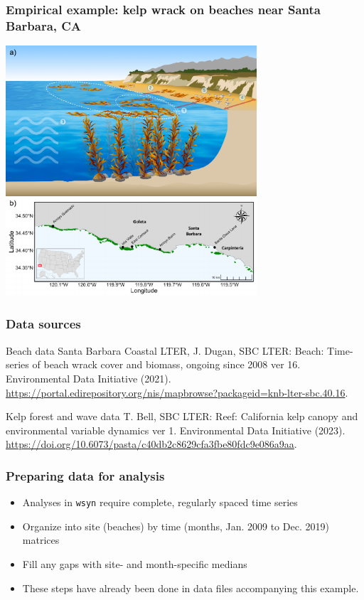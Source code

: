 \documentclass{beamer}
\begin{document}
\begin{frame}
\frametitle{Empirical example: kelp wrack on beaches near Santa Barbara, CA}
\centering
\includegraphics[width=0.7\textwidth]{../talk/figures/wrack_concept.pdf}
\end{frame}

\begin{frame}
\frametitle{Data sources}
\begin{block}{Beach data}
Santa Barbara Coastal LTER, J. Dugan, SBC LTER: Beach: Time-series of beach wrack cover and biomass, ongoing since 2008 ver 16. Environmental Data Initiative (2021). \url{https://portal.edirepository.org/nis/mapbrowse?packageid=knb-lter-sbc.40.16}.
\end{block}
\begin{block}{Kelp forest and wave data}
T. Bell, SBC LTER: Reef: California kelp canopy and environmental variable dynamics ver 1.
Environmental Data Initiative (2023). \url{https://doi.org/10.6073/pasta/c40db2c8629cfa3fbe80fdc9e086a9aa}.
\end{block}
\end{frame}

\begin{frame}
\frametitle{Preparing data for analysis}
\begin{itemize}
\item Analyses in \texttt{wsyn} require complete, regularly spaced time series
\item Organize into site (beaches) by time (months, Jan. 2009 to Dec. 2019) matrices
\item Fill any gaps with site- and month-specific medians
\item These steps have already been done in data files accompanying this example.
\end{itemize}
\end{frame}
\end{document}
